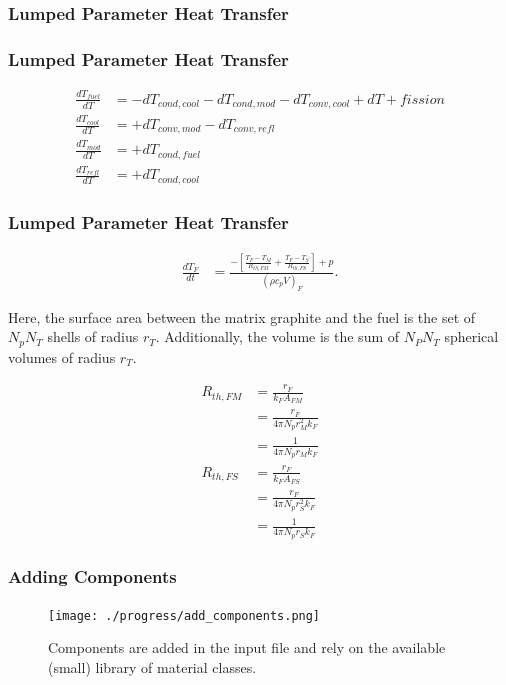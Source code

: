 \begin{frame}[fragile]
  \frametitle{Lumped Parameter Heat Transfer}

\end{frame}

\begin{frame}[fragile]
  \frametitle{Lumped Parameter Heat Transfer}
\footnotesize{
  \begin{align}
    \frac{dT_{fuel}}{dT} &=  - dT_{cond,cool} - dT_{cond,mod} - dT_{conv,cool} + dT+{fission}\\
    \frac{dT_{cool}}{dT} &=  + dT_{conv,mod} - dT_{conv,refl} \\
    \frac{dT_{mod}}{dT}  &=  + dT_{cond,fuel}\\
    \frac{dT_{refl}}{dT} &=  + dT_{cond,cool}
  \end{align}
}
\end{frame}


\begin{frame}[fragile]
\frametitle{Lumped Parameter Heat Transfer}
\footnotesize{
\begin{align}
\frac{dT_{F}}{dt} &= \frac{-\left[\frac{T_{F} - T_{M}}{R_{th,FM}} +
\frac{T_{F}-T_{S}}{R_{th,FS}}\right] + p}{\left(\rho c_pV\right)_{F}}.
\label{dTfdt}
\end{align}

Here, the surface area between the matrix graphite and the fuel is the set of
$N_pN_T$ shells of radius $r_T$.  Additionally, the volume is the sum of
$N_PN_T$ spherical volumes of radius $r_T$.

\begin{align}
R_{th,FM} &= \frac{r_F}{k_FA_{FM}}\\
          &= \frac{r_F}{4\pi N_pr_M^2k_F}\\
          &= \frac{1}{4\pi N_pr_Mk_F}\\
R_{th,FS} &= \frac{r_F}{k_FA_{FS}}\\
          &= \frac{r_F}{4\pi N_pr_S^2k_F}\\
          &= \frac{1}{4\pi N_pr_Sk_F}
\end{align}
}
\end{frame}



\begin{frame}[fragile]
\frametitle{Adding Components}
  \begin{figure}[htbp!]
    \begin{center}
      \texttt{[image: ./progress/add\_components.png]}
    \end{center}
    \caption{Components are added in the input file and rely on the available
    (small) library of material classes.}
    \label{fig:ss_w_o_feedbacks}
  \end{figure}
\end{frame}

